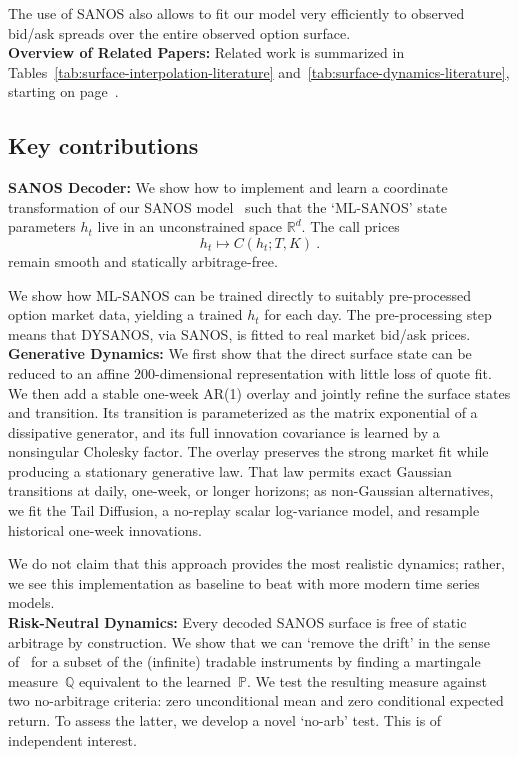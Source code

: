 \documentclass[11pt,a4paper]{article}
\newcommand{\R}{\mathbb{R}}
\newcommand{\Q}{\mathbb{Q}}
\renewcommand{\P}{\mathbb{P}}
\renewcommand{\Q}{\mathbb{Q}}
\begin{document}
The use of SANOS also allows to fit our model very efficiently to observed bid/ask spreads over the entire observed option surface.\\

\noindent
\textbf{Overview of Related Papers:}
Related work is summarized in Tables~\ref{tab:surface-interpolation-literature}
and~\ref{tab:surface-dynamics-literature}, starting on
page~\pageref{tab:surface-interpolation-literature}.

\subsection*{Key contributions}

\noindent
\textbf{SANOS Decoder:}
    We show how to implement and learn a coordinate transformation of
    our SANOS model~\citep{SANOS2026}
    such that the `ML-SANOS' state parameters $h_t$ live in an unconstrained space
    $\R^{d}$.  The call
    prices
    $$
        h_t \longmapsto C(h_t;T,K)  \ .
    $$
    remain smooth and statically arbitrage-free.

    We show how ML-SANOS can be trained directly to suitably pre-processed
    option market data, yielding a trained $h_t$ for each day.
    The pre-processing step means that DYSANOS, via SANOS, is fitted to real market bid/ask prices.\\

\noindent
\textbf{Generative Dynamics:}
    We first show that the direct surface state can be reduced to an
    affine 200-dimensional representation with little loss of quote fit.  We
    then add a stable one-week AR(1) overlay and jointly refine the surface
    states and transition.  Its transition is parameterized as the matrix
    exponential of a dissipative generator, and its full innovation
    covariance is learned by a nonsingular Cholesky factor.  The overlay
    preserves the strong market fit while producing a stationary generative
    law.  That law permits exact Gaussian transitions at daily, one-week, or
    longer horizons; as non-Gaussian alternatives, we fit the Tail Diffusion,
    a no-replay scalar log-variance model, and resample historical one-week
    innovations.

    We do not
    claim that this approach provides the most realistic dynamics; rather,
    we see this implementation as baseline to beat with more modern
    time series models.\\

    \noindent
\textbf{Risk-Neutral Dynamics:}
Every decoded SANOS surface is free of static arbitrage by construction.
We show that we can `remove the drift' in the sense of~\citet{removedrift} for a subset of the (infinite) tradable instruments
by finding a martingale measure~$\Q$ equivalent to the learned~$\P$.
We test the resulting measure against two no-arbitrage criteria: zero
unconditional mean and zero conditional expected return. To assess the latter, we develop a novel `no-arb' test.
This is of independent interest.
\end{document}
